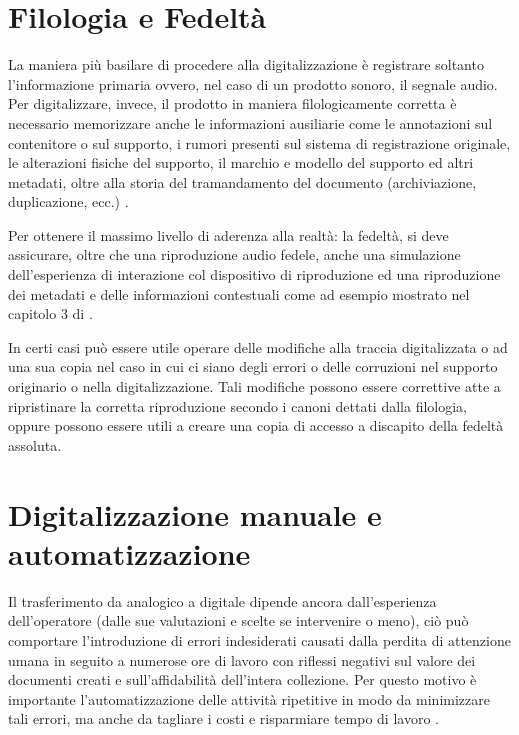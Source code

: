 \section{Filologia e Fedeltà} \label{sec:filologia-fedeltà}
La maniera più basilare di procedere alla digitalizzazione è registrare soltanto l'informazione primaria ovvero, nel caso di un prodotto sonoro, il segnale audio.
Per digitalizzare, invece, il prodotto in maniera filologicamente corretta è necessario memorizzare anche le informazioni ausiliarie come le annotazioni sul contenitore o sul supporto, i rumori presenti sul sistema di registrazione originale, le alterazioni fisiche del supporto, il marchio e modello del supporto ed altri metadati, oltre alla storia del tramandamento del documento (archiviazione, duplicazione, ecc.) \cite[p. 59]{prettoComputingMethodologiesSupporting2018}.

Per ottenere il massimo livello di aderenza alla realtà: la fedeltà, si deve assicurare, oltre che una riproduzione audio fedele, anche una simulazione dell'esperienza di interazione col dispositivo di riproduzione ed una riproduzione dei metadati e delle informazioni contestuali come ad esempio mostrato nel capitolo 3 di \textcite{fantozziTapeMusicArchives2017}.

In certi casi può essere utile operare delle modifiche alla traccia digitalizzata o ad una sua copia nel caso in cui ci siano degli errori o delle corruzioni nel supporto originario o nella digitalizzazione. Tali modifiche possono essere correttive atte a ripristinare la corretta riproduzione secondo i canoni dettati dalla filologia, oppure possono essere utili a creare una copia di accesso a discapito della fedeltà assoluta.


\section{Digitalizzazione manuale e automatizzazione} \label{sec:digitalizzazione-man-vs-auto}
Il trasferimento da analogico a digitale dipende ancora dall'esperienza dell'operatore (dalle sue valutazioni e scelte se intervenire o meno), ciò può comportare l'introduzione di errori indesiderati causati dalla perdita di attenzione umana in seguito a numerose ore di lavoro con riflessi negativi sul valore dei documenti creati e sull'affidabilità dell'intera collezione.
Per questo motivo è importante l'automatizzazione delle attività ripetitive in modo da minimizzare tali errori, ma anche da tagliare i costi e risparmiare tempo di lavoro \cites[cap. 2.1]{fantozziTapeMusicArchives2017}[es. 5]{mpaiApplicationNoteRev}.


